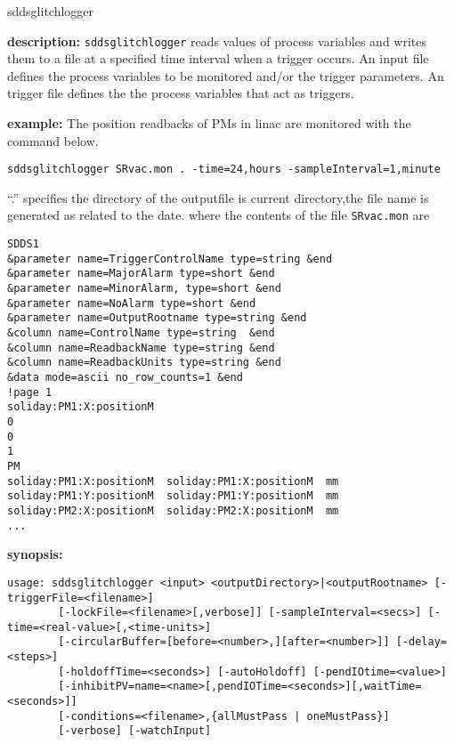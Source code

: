 %
%
\begin{sddsprog}{sddsglitchlogger}
\item {\bf description:}
%
%
\verb+sddsglitchlogger+ reads values of process variables and writes them to a file at a specified time interval when a trigger occurs.
An input file defines the process variables to be monitored and/or the trigger parameters.
An trigger file defines the the process variables that act as triggers.
\item {\bf example:} 
%
% 
%
The position readbacks of PMs in linac are monitored with the command below.
\begin{verbatim}
sddsglitchlogger SRvac.mon . -time=24,hours -sampleInterval=1,minute
\end{verbatim}
``.'' specifies the directory of the outputfile is current directory,the file name is generated
as related to the date.
where the contents of the file \verb+SRvac.mon+ are
\begin{verbatim}
SDDS1
&parameter name=TriggerControlName type=string &end
&parameter name=MajorAlarm type=short &end
&parameter name=MinorAlarm, type=short &end
&parameter name=NoAlarm type=short &end
&parameter name=OutputRootname type=string &end
&column name=ControlName type=string  &end
&column name=ReadbackName type=string &end
&column name=ReadbackUnits type=string &end
&data mode=ascii no_row_counts=1 &end
!page 1
soliday:PM1:X:positionM
0
0
1
PM
soliday:PM1:X:positionM  soliday:PM1:X:positionM  mm
soliday:PM1:Y:positionM  soliday:PM1:Y:positionM  mm
soliday:PM2:X:positionM  soliday:PM2:X:positionM  mm
...
\end{verbatim}
\item {\bf synopsis:} 
%
%
\begin{verbatim}
usage: sddsglitchlogger <input> <outputDirectory>|<outputRootname> [-triggerFile=<filename>]
        [-lockFile=<filename>[,verbose]] [-sampleInterval=<secs>] [-time=<real-value>[,<time-units>]
        [-circularBuffer=[before=<number>,][after=<number>]] [-delay=<steps>]
        [-holdoffTime=<seconds>] [-autoHoldoff] [-pendIOtime=<value>]
        [-inhibitPV=name=<name>[,pendIOTime=<seconds>][,waitTime=<seconds>]]
        [-conditions=<filename>,{allMustPass | oneMustPass}]
        [-verbose] [-watchInput]

\end{verbatim}
\end{sddsprog}
